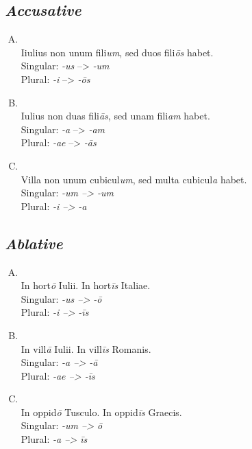 \subsection{\emph{Accusative}}
\begin{enumerate}[(A)]
  \item {}\\
      Iiulius non unum fili\emph{um}, sed duos fili\emph{\=os} habet.\\
      Singular: \emph{-us} --> \emph{-um}\\
      Plural: \emph{-i} --> \emph{-\=os}
  \item {}\\
      Iulius non duas fili\emph{\=as}, sed unam fili\emph{am} habet.\\
      Singular: \emph{-a} --> \emph{-am}\\
      Plural: \emph{-ae} --> \emph{-\=as}
  \item {}\\
      Villa non unum cubicul\emph{um}, sed multa cubicul\emph{a} habet.\\
      Singular: \emph{-um --> -um}\\
      Plural: \emph{-i --> -a}
\end{enumerate}

\subsection{\emph{Ablative}}
\begin{enumerate}[(A)]
  \item {}\\
      In hort\emph{\=o} Iulii. In hort\emph{\=is} Italiae.\\
      Singular: \emph{-us --> -\=o}\\
      Plural: \emph{-i --> -\=is}
  \item {}\\
      In vill\emph{\=a} Iulii. In vill\emph{\=is} Romanis.\\
      Singular: \emph{-a --> -\=a}\\
      Plural: \emph{-ae --> -\=is}
  \item {}\\
      In oppid\emph{\=o} Tusculo. In oppid\emph{\=is} Graecis.\\
      Singular: \emph{-um --> \=o}\\
      Plural: \emph{-a --> \=is}
\end{enumerate}

